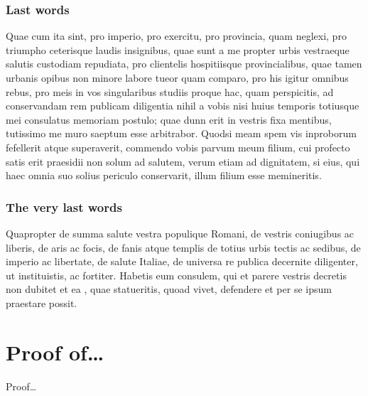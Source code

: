\documentclass[a4paper,12pt,twoside,swedish]{report}
\begin{document}
\subsection{Last words}
 Quae cum ita sint, pro imperio, pro exercitu, pro provincia, quam
neglexi, pro triumpho ceterisque laudis insignibus, quae sunt a me
propter urbis vestraeque salutis custodiam repudiata, pro clientelis
hospitiisque provincialibus, quae tamen urbanis opibus non minore labore
tueor quam comparo, pro his igitur omnibus rebus, pro meis in vos
singularibus studiis proque hac, quam perspicitis, ad conservandam rem
publicam diligentia nihil a vobis nisi huius temporis totiusque mei
consulatus memoriam postulo; quae dunn erit in vestris fixa mentibus,
tutissimo me muro saeptum esse arbitrabor. Quodsi meam spem vis
inproborum fefellerit atque superaverit, commendo vobis parvum meum
filium, cui profecto satis erit praesidii non solum ad salutem, verum
etiam ad dignitatem, si eius, qui haec omnia suo solius periculo
conservarit, illum filium esse memineritis.

\subsection{The very last words}
Quapropter de summa salute
vestra populique Romani, de vestris coniugibus ac liberis, de aris ac
focis, de fanis atque templis de totius urbis tectis ac sedibus, de
imperio ac libertate, de salute Italiae, de universa re publica
decernite diligenter, ut instituistis, ac fortiter. Habetis eum
consulem, qui et parere vestris decretis non dubitet et ea \cite{fortran}, quae
statueritis, quoad vivet, defendere et per se ipsum praestare possit.






\pagestyle{empty}

\appendix

\chapter{Proof of\dots}

\label{app:proof1}

\thispagestyle{empty}

Proof\dots
\end{document}
